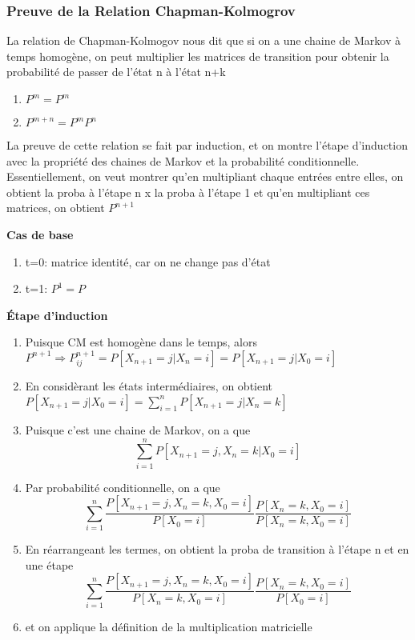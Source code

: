 \documentclass{article}
\begin{document}
\subsubsection{Preuve de la Relation Chapman-Kolmogrov}

La relation de Chapman-Kolmogov nous dit que si on a une chaine de
Markov à temps homogène, on peut multiplier les matrices de transition
pour obtenir la probabilité de passer de l'état n à l'état n+k
\begin{enumerate}
    \item $ P^{m}=P^m$
    \item $ P^{m+n}=P^m P^n$
\end{enumerate}

La preuve de cette relation se fait par induction, et on montre
l'étape d'induction avec la propriété des chaines de Markov et la
probabilité conditionnelle. Essentiellement, on veut montrer qu'en
multipliant chaque entrées entre elles, on obtient la proba à l'étape
n x la proba à l'étape 1 et qu'en multipliant ces matrices, on obtient
$ P^{n+1}$

\textbf{Cas de base}

\begin{enumerate}
    \item t=0: matrice identité, car on ne change pas d'état
    \item t=1: $P^1 = P$
\end{enumerate}

\textbf{Étape d'induction}

\begin{enumerate}
    \item Puisque CM est homogène dans le temps, alors
	$ P^{n+1} \Longrightarrow P_{ij} ^{n+1} = P[X_{n+1} = j | X_n = i]
	= P[X_{n+1} =j | X_0 = i] $
    \item En considèrant les états intermédiaires, on obtient
	$ P[X_{n+1}=j | X_0 = i] = \sum^{n}_{i=1} P[X_{n+1} = j | X_n = k]$
    \item Puisque c'est une chaine de Markov, on a que
	$$ \sum^{n}_{i=1} P[X_{n+1} = j, X_n = k | X_0 = i]$$
    \item Par probabilité conditionnelle, on a que
	$$ \sum^{n}_{i=1} \frac{P[X_{n+1} = j, X_n = k, X_0 = i]}
	{P[X_0=i]} \frac{P[X_n = k, X_0=i]}{P[X_n = k, X_0=i]} $$
    \item En réarrangeant les termes, on obtient la proba de transition
	à l'étape n et en une étape
	$$ \sum^{n}_{i=1} \frac{P[X_{n+1} = j, X_n = k, X_0 = i]}
	{P[X_n = k, X_0=i]} \frac{P[X_n = k, X_0=i]}{P[X_0=i]} $$
    \item et on applique la définition de la multiplication matricielle
\end{enumerate}
\end{document}
